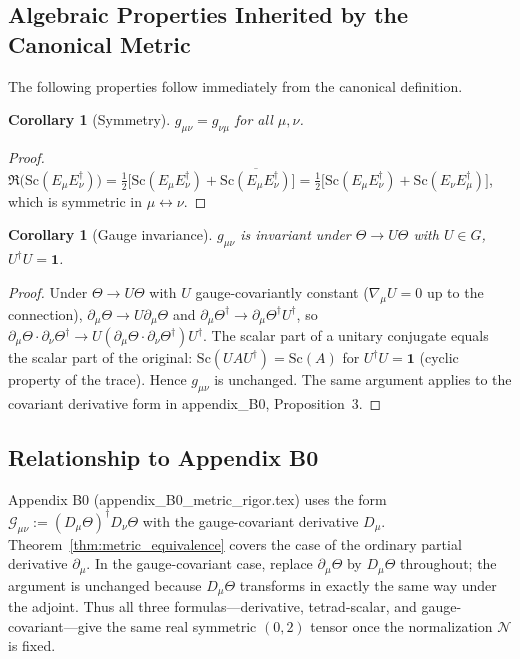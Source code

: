 \documentclass[12pt]{article}
\newtheorem{corollary}[theorem]{Corollary}
\theoremstyle{definition}
\theoremstyle{remark}
\begin{document}
\subsection{Algebraic Properties Inherited by the Canonical Metric}

The following properties follow immediately from the canonical definition.

\begin{corollary}[Symmetry]
$g_{\mu\nu} = g_{\nu\mu}$ for all $\mu,\nu$.
\end{corollary}
\begin{proof}
$\Re\!\bigl(\mathrm{Sc}(E_\mu E_\nu^\dagger)\bigr)
 = \tfrac{1}{2}\bigl[\mathrm{Sc}(E_\mu E_\nu^\dagger)+\overline{\mathrm{Sc}(E_\mu E_\nu^\dagger)}\bigr]
 = \tfrac{1}{2}\bigl[\mathrm{Sc}(E_\mu E_\nu^\dagger)+\mathrm{Sc}(E_\nu E_\mu^\dagger)\bigr]$,
which is symmetric in $\mu\leftrightarrow\nu$.
\end{proof}

\begin{corollary}[Gauge invariance]
$g_{\mu\nu}$ is invariant under $\Theta\to U\Theta$ with $U\in G$, $U^\dagger U=\mathbf{1}$.
\end{corollary}
\begin{proof}
Under $\Theta\to U\Theta$ with $U$ gauge-covariantly constant ($\nabla_\mu U=0$ up to the
connection), $\partial_\mu\Theta\to U\partial_\mu\Theta$ and
$\partial_\mu\Theta^\dagger\to\partial_\mu\Theta^\dagger U^\dagger$, so
$\partial_\mu\Theta\cdot\partial_\nu\Theta^\dagger\to U(\partial_\mu\Theta\cdot\partial_\nu\Theta^\dagger)U^\dagger$.
The scalar part of a unitary conjugate equals the scalar part of the original:
$\mathrm{Sc}(UAU^\dagger)=\mathrm{Sc}(A)$ for $U^\dagger U=\mathbf{1}$
(cyclic property of the trace).  Hence $g_{\mu\nu}$ is unchanged.  The same
argument applies to the covariant derivative form in appendix\_B0, Proposition~3.
\end{proof}

\subsection{Relationship to Appendix B0}

Appendix B0 (appendix\_B0\_metric\_rigor.tex) uses the form
$\mathcal{G}_{\mu\nu} := (D_\mu\Theta)^\dagger D_\nu\Theta$ with the gauge-covariant
derivative $D_\mu$.  Theorem~\ref{thm:metric_equivalence} covers the case of the
ordinary partial derivative $\partial_\mu$.  In the gauge-covariant case, replace
$\partial_\mu\Theta$ by $D_\mu\Theta$ throughout; the argument is unchanged because
$D_\mu\Theta$ transforms in exactly the same way under the adjoint.  Thus
all three formulas—derivative, tetrad-scalar, and gauge-covariant—give the same
real symmetric $(0,2)$ tensor once the normalization $\mathcal{N}$ is fixed.
\end{document}
